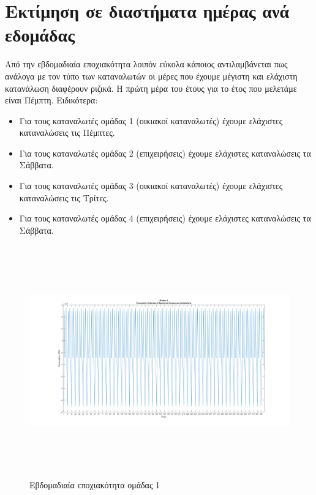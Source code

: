 \documentclass[a4paper, 11pt]{article}
\begin{document}
\section*{Εκτίμηση σε διαστήματα ημέρας ανά εδομάδας}
Από την εβδομαδιαία εποχιακότητα λοιπόν εύκολα κάποιος αντιλαμβάνεται πως ανάλογα με τον τύπο των καταναλωτών οι μέρες που έχουμε μέγιστη και ελάχιστη κατανάλωση διαφέρουν ριζικά. Η πρώτη μέρα του έτους για το έτος που μελετάμε είναι Πέμπτη. Ειδικότερα:
\begin{itemize}
\item Για τους καταναλωτές ομάδας 1 (οικιακοί καταναλωτές) έχουμε ελάχιστες καταναλώσεις τις Πέμπτες.
\item Για τους καταναλωτές ομάδας 2 (επιχειρήσεις) έχουμε ελάχιστες καταναλώσεις τα Σάββατα.
\item Για τους καταναλωτές ομάδας 3 (οικιακοί καταναλωτές) έχουμε ελάχιστες καταναλώσεις τις Τρίτες.
\item Για τους καταναλωτές ομάδας 4 (επιχειρήσεις) έχουμε ελάχιστες καταναλώσεις τα Σάββατα.
\end{itemize}
\newpage
\begin{figure}[ht!]
\centering
\includegraphics[width=180mm, height=100mm]{../../plots/Trend_estimation/seasonal_1.png}
\caption{Εβδομαδιαία εποχιακότητα ομάδας 1\label{seas1}}
\end{figure}
\end{document}
